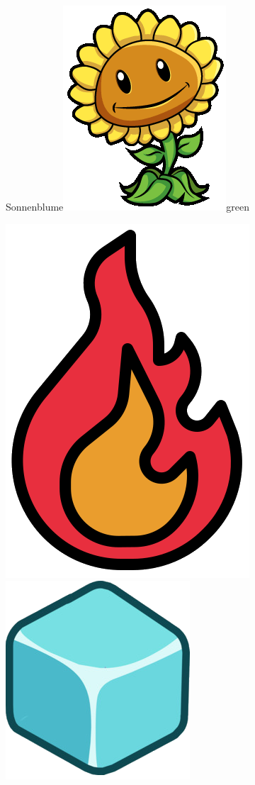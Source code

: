 \documentclass[11pt, a5paper]{article}
\def\now{\hspace{0.2cm}}
\begin{document}
\begin{mybox}{Sonnenblume}{\includegraphics[scale=0.1]{sunflower}}{green}
\begin{minipage}[t]{\textwidth}
			\now\includegraphics[scale=0.075]{firef} 
			\now\includegraphics[scale=0.3]{icei} 
		\end{minipage}
	\end{mybox}
	
\end{document}
